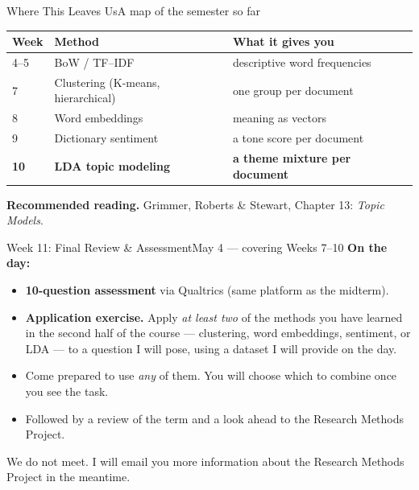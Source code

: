 \documentclass[aspectratio=169,10pt]{beamer}
\begin{document}
\begin{frame}{Where This Leaves Us}{A map of the semester so far}
  \begin{center}
    \small
    \begin{tabular}{@{}l l l@{}}
      \toprule
      \textbf{Week} & \textbf{Method}                    & \textbf{What it gives you} \\
      \midrule
      4--5 & BoW / TF--IDF                              & descriptive word frequencies \\
      7    & Clustering (K-means, hierarchical)         & one group per document \\
      8    & Word embeddings                            & meaning as vectors \\
      9    & Dictionary sentiment                       & a tone score per document \\
      \textbf{10} & \textbf{LDA topic modeling}        & \textbf{a theme mixture per document} \\
      \bottomrule
    \end{tabular}
  \end{center}

  \vspace{0.6em}
  \textbf{Recommended reading.} Grimmer, Roberts \& Stewart, Chapter 13: \emph{Topic Models}.
\end{frame}

\begin{frame}{Week 11: Final Review \& Assessment}{May 4 --- covering Weeks 7--10}
  \textbf{On the day:}
  \begin{itemize}
    \item \textbf{10-question assessment} via Qualtrics (same platform as the midterm).
    \item \textbf{Application exercise.} Apply \emph{at least two} of the methods you have learned in the second half of the course --- clustering, word embeddings, sentiment, or LDA --- to a question I will pose, using a dataset I will provide on the day.
    \item Come prepared to use \emph{any} of them. You will choose which to combine once you see the task.
    \item Followed by a review of the term and a look ahead to the Research Methods Project.
  \end{itemize}

  \vspace{0.4em}
  \begin{callblue}
    We do not meet. I will email you more information about the Research Methods Project in the meantime.
  \end{callblue}
\end{frame}
\end{document}
